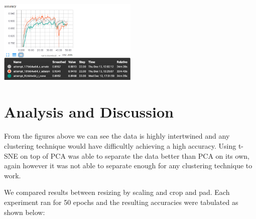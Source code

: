 \documentclass{article}
\begin{document}
\begin{minipage}[c]{\linewidth}
	
	\includegraphics[width=0.5\textwidth]{./figures/acc_smote_adaysn_none.png}
	
\end{minipage}


\section{Analysis and Discussion}
\paragraph{}
From the figures above we can see the data is highly intertwined and any clustering technique would have difficultly achieving a high accuracy. Using t-SNE on top of PCA was able to separate the data better than PCA on its own, again however it was not able to separate enough for any clustering technique to work.


We compared results between resizing by scaling and crop and pad. Each experiment ran for 50 epochs and the resulting accuracies were tabulated as shown below:
\end{document}

